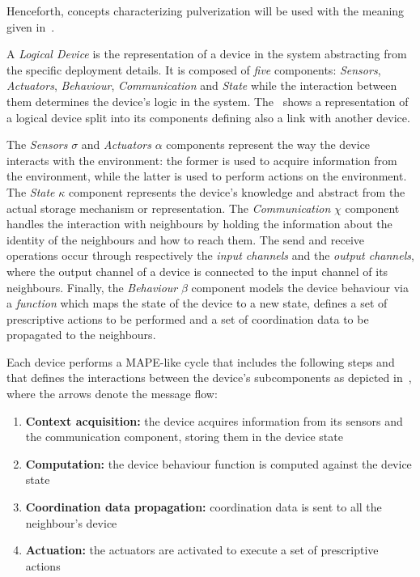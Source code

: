 Henceforth, concepts characterizing pulverization will be used with the meaning given in~.

A \emph{Logical Device} is the representation of a device in the system abstracting from the specific deployment details.
It is composed of \emph{five} components: \emph{Sensors}, \emph{Actuators}, \emph{Behaviour}, \emph{Communication} and \emph{State} while the
interaction between them determines the device's logic in the system. The~ shows a representation of a logical device
split into its components defining also a link with another device.

The \emph{Sensors} $\sigma$ and \emph{Actuators} $\alpha$ components represent the way the device interacts with the environment: the former is used
to acquire information from the environment, while the latter is used to perform actions on the environment.
The \emph{State} $\kappa$ component represents the device's knowledge and abstract from the actual storage mechanism or representation.
The \emph{Communication} $\chi$ component handles the interaction with neighbours by holding the information about the identity of the neighbours and
how to reach them. The send and receive operations occur through respectively the \emph{input channels} and the \emph{output channels}, where the
output channel of a device is connected to the input channel of its neighbours.
Finally, the \emph{Behaviour} $\beta$ component models the device behaviour via a \emph{function} which maps the state of the device to a new state,
defines a set of prescriptive actions to be performed and a set of coordination data to be propagated to the neighbours.

Each device performs a MAPE-like cycle that includes the following steps and that defines the interactions between the device's subcomponents as
depicted in~, where the arrows denote the message flow:

\begin{enumerate}
	\item \textbf{Context acquisition:} the device acquires information from its sensors and the communication component, storing them in the device
	      state
	\item \textbf{Computation:} the device behaviour function is computed against the device state
	\item \textbf{Coordination data propagation:} coordination data is sent to all the neighbour's device
	\item \textbf{Actuation:} the actuators are activated to execute a set of prescriptive actions
\end{enumerate}

